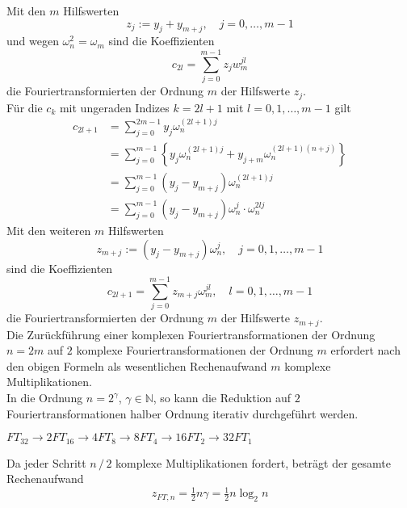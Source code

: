 Mit den $m$ Hilfswerten 
\[
    z_j := y_j + y_{m+j}, \quad j=0,\dots,m-1
\]
und wegen $\omega_n^2 = \omega_m$ sind die Koeffizienten 
\[
    c_{2l} = \sum_{j=0}^{m-1} z_jw_m^{jl}
\]
die Fouriertransformierten der Ordnung $m$ der Hilfswerte $z_j$. \\
Für die $c_k$ mit ungeraden Indizes $k=2l+1$ mit $l=0,1,\dots,m-1$ gilt 
\begin{align*}
    c_{2l+1} &= \sum_{j=0}^{2m-1} y_j\omega_n^{(2l+1)j} \\
    &= \sum_{j=0}^{m-1}\left\{ y_j\omega_n^{(2l+1)j}+y_{j+m}\omega_n^{(2l+1)(n+j)}\right\}\\
    &= \sum_{j=0}^{m-1}(y_j-y_{m+j})\omega_n^{(2l+1)j} \\
    &= \sum_{j=0}^{m-1}(y_j-y_{m+j})\omega_n^{j}\cdot\omega_n^{2lj}
\end{align*}
Mit den weiteren $m$ Hilfswerten
\[
    z_{m+j} := (y_j-y_{m+j})\omega_n^j,\quad j=0,1,\dots,m-1
\]
sind die Koeffizienten
\[
    c_{2l+1} = \sum_{j=0}^{m-1} z_{m+j} \omega_m^{jl}, \quad l=0,1,\dots,m-1
\]
die Fouriertransformierten der Ordnung $m$ der Hilfswerte $z_{m+j}$. \\
Die Zurückführung einer komplexen Fouriertransformationen der Ordnung $n=2m$ auf $2$ komplexe Fouriertransformationen 
der Ordnung $m$ erfordert nach den obigen Formeln als wesentlichen Rechenaufwand $m$ komplexe Multiplikationen. \\
In die Ordnung $n=2^\gamma$, $\gamma\in\mathbb{N}$, so kann die Reduktion auf $2$ Fouriertransformationen halber Ordnung
iterativ durchgeführt werden. \\
\begin{egbox}
    $FT_{32} \to 2FT_{16}\to 4FT_8 \to 8FT_4 \to 16FT_2\to 32FT_1$
\end{egbox}
Da jeder Schritt $n\,/\,2$ komplexe Multiplikationen fordert, beträgt der gesamte Rechenaufwand
\[
    z_{FT,n} = \tfrac{1}{2}n\gamma = \tfrac{1}{2}n\log_2 n
\]
